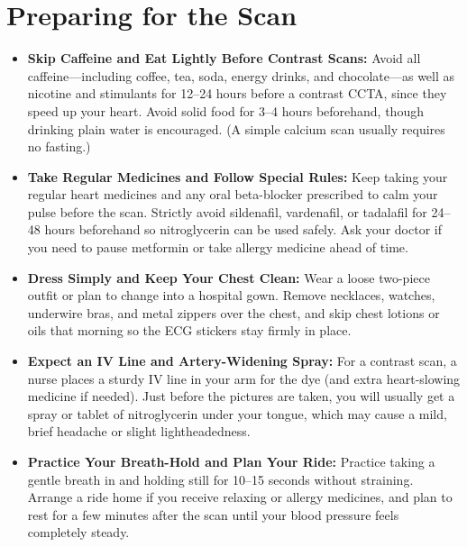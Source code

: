 \section{Preparing for the Scan}
\begin{itemize}
    \item \textbf{Skip Caffeine and Eat Lightly Before Contrast Scans:} Avoid all caffeine---including coffee, tea, soda, energy drinks, and chocolate---as well as nicotine and stimulants for 12--24 hours before a contrast CCTA, since they speed up your heart. Avoid solid food for 3--4 hours beforehand, though drinking plain water is encouraged. (A simple calcium scan usually requires no fasting.)
    \item \textbf{Take Regular Medicines and Follow Special Rules:} Keep taking your regular heart medicines and any oral beta-blocker prescribed to calm your pulse before the scan. Strictly avoid sildenafil, vardenafil, or tadalafil for 24--48 hours beforehand so nitroglycerin can be used safely. Ask your doctor if you need to pause metformin or take allergy medicine ahead of time.
    \item \textbf{Dress Simply and Keep Your Chest Clean:} Wear a loose two-piece outfit or plan to change into a hospital gown. Remove necklaces, watches, underwire bras, and metal zippers over the chest, and skip chest lotions or oils that morning so the ECG stickers stay firmly in place.
    \item \textbf{Expect an IV Line and Artery-Widening Spray:} For a contrast scan, a nurse places a sturdy IV line in your arm for the dye (and extra heart-slowing medicine if needed). Just before the pictures are taken, you will usually get a spray or tablet of nitroglycerin under your tongue, which may cause a mild, brief headache or slight lightheadedness.
    \item \textbf{Practice Your Breath-Hold and Plan Your Ride:} Practice taking a gentle breath in and holding still for 10--15 seconds without straining. Arrange a ride home if you receive relaxing or allergy medicines, and plan to rest for a few minutes after the scan until your blood pressure feels completely steady.
\end{itemize}

